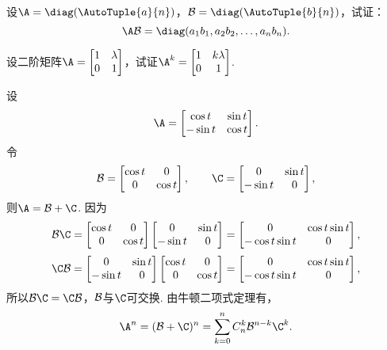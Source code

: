 \begin{example}
设\(\A=\diag(\AutoTuple{a}{n})\)，\(\B=\diag(\AutoTuple{b}{n})\)，试证：\[
\A \B = \diag(a_1 b_1,a_2 b_2,\dotsc,a_n b_n).
\]
\end{example}

\begin{example}
设二阶矩阵\(\A=\begin{bmatrix} 1 & \lambda \\ 0 & 1 \end{bmatrix}\)，试证\(\A^k=\begin{bmatrix} 1 & k\lambda \\ 0 & 1 \end{bmatrix}\).
\end{example}

\begin{example}
设\[
\A = \begin{bmatrix}
\cos t & \sin t \\
-\sin t & \cos t
\end{bmatrix}.
\]令\[
\B = \begin{bmatrix}
\cos t & 0 \\
0 & \cos t
\end{bmatrix}, \qquad
\C = \begin{bmatrix}
0 & \sin t \\
-\sin t & 0
\end{bmatrix},
\]则\(\A=\B+\C\).
因为\[
\B\C = \begin{bmatrix}
\cos t & 0 \\
0 & \cos t
\end{bmatrix} \begin{bmatrix}
0 & \sin t \\
-\sin t & 0
\end{bmatrix} = \begin{bmatrix}
0 & \cos t \sin t \\
-\cos t \sin t & 0
\end{bmatrix},
\]\[
\C\B = \begin{bmatrix}
0 & \sin t \\
-\sin t & 0
\end{bmatrix} \begin{bmatrix}
\cos t & 0 \\
0 & \cos t
\end{bmatrix} = \begin{bmatrix}
0 & \cos t \sin t \\
-\cos t \sin t & 0
\end{bmatrix},
\]所以\(\B\C=\C\B\)，\(\mathcal{B}\)与\(\C\)可交换.
由牛顿二项式定理有，\[
\A^n=(\B+\C)^n
=\sum\limits_{k=0}^n C_n^k \B^{n-k} \C^k.
\]
\end{example}

